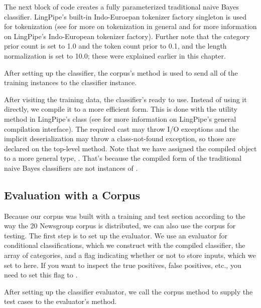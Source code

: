The next block of code creates a fully parameterized traditional
naive Bayes classifier.
%
%
LingPipe's built-in Indo-Euroepan tokenizer factory singleton is used
for tokenization (see  for more on tokenization
in general and  for more information on
LingPipe's Indo-European tokenizer factory).  Further note that the
category prior count is set to 1.0 and the token count prior to 0.1,
and the length normalization is set to 10.0; these were explained
earlier in this chapter.

After setting up the classifier, the corpus's 
method is used to send all of the training instances to the
classifier instance.  

After visiting the training data, the classifier's ready to use.
Instead of using it directly, we compile it to a more efficient form.
This is done with the utility method  in LingPipe's
 class (see  for
more information on LingPipe's general compilation interface).  The
required cast may throw I/O exceptions and the implicit
deserialization may throw a class-not-found exception, so those are
declared on the top-level  method.  Note that we have
assigned the compiled object to a more general type,
.  That's because the compiled form of the
traditional naive Bayes classifiers are not instances of
.

\subsection{Evaluation with a Corpus}

Because our corpus was built with a training and test section
according to the way the 20 Newsgroup corpus is distributed, we can
also use the corpus for testing.  The first step is to set up the
evaluator.  
%
%
We use an evaluator for conditional classifications, which
we construct with the compiled classifier, the array of categories, and
a flag indicating whether or not to store inputs, which we set to
 here.  If you want to inspect the true positives, false
positives, etc., you need to set this flag to .  

After setting up the classifier evaluator, we call the corpus
method  to supply the test cases to the 
evaluator's  method.  

